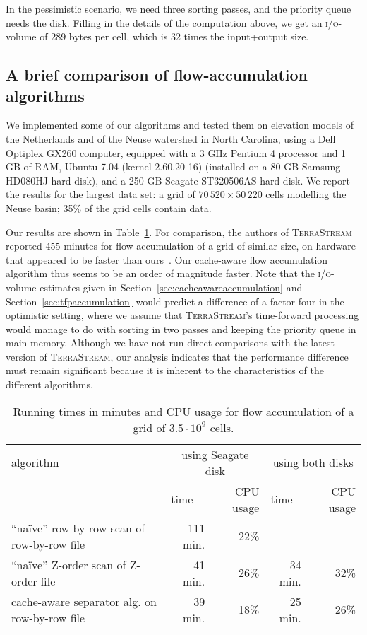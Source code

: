\documentclass[10pt,a4paper]{article}
\def\io{\textsc{i/o}\xspace}
\def\tsm{\textsc{TerraStream}\xspace}
\begin{document}
In the pessimistic scenario, we need three sorting passes, and the priority queue needs the disk. Filling in the details of the computation above, we get an \io-volume of 289 bytes per cell, which is 32 times the input+output size.

\subsection{A brief comparison of flow-accumulation algorithms}\label{sec:evaluation}
We implemented some of our algorithms and tested them on elevation models of the Netherlands and of the Neuse watershed in North Carolina, using a Dell Optiplex GX260 computer, equipped with a 3 GHz Pentium 4 processor and 1 GB of RAM, Ubuntu 7.04 (kernel 2.60.20-16) (installed on a 80 GB Samsung HD080HJ hard disk), and a 250 GB Seagate ST320506AS hard disk. We report the results for the largest data set: a grid of $70\,520 \times 50\,220$ cells modelling the Neuse basin; 35\% of the grid cells contain data.

Our results are shown in Table~\ref{tab:runningtimes}. For comparison, the authors of \tsm reported 455 minutes for flow accumulation of a grid of similar size, on hardware that appeared to be faster than ours~\cite{terrastream}.
Our cache-aware flow accumulation algorithm thus seems to be an order of magnitude faster. Note that the \io-volume estimates given in Section~\ref{sec:cacheawareaccumulation} and Section~\ref{sec:tfpaccumulation} would predict a difference of a factor four in the optimistic setting, where we assume that \tsm's time-forward processing would manage to do with sorting in two passes and keeping the priority queue in main memory. Although we have not run direct comparisons with the latest version of \tsm, our analysis indicates that the performance difference must remain significant because it is inherent to the characteristics of the different algorithms.

\begin{table}
\centering{}
\begin{tabular}{|l|rr|rr|}
\hline
algorithm                      & \multicolumn{2}{c|}{using Seagate disk} & \multicolumn{2}{c|}{using both disks} \\
&  \multicolumn{1}{l}{time} & CPU usage                & \multicolumn{1}{l}{time} & CPU usage\\

\hline
``na\"ive'' row-by-row scan of row-by-row file & 111 min. & 22\% & & \\
``na\"ive'' Z-order scan of Z-order file    & 41 min. & 26\% & 34 min. & 32\% \\
cache-aware separator alg. on row-by-row file & 39 min. & 18\% & 25 min. & 26\% \\
\hline
\end{tabular}
\caption{Running times in minutes and CPU usage for flow accumulation of a grid of $3.5 \cdot 10^9$ cells.}
\label{tab:runningtimes}
\end{table}
\end{document}
